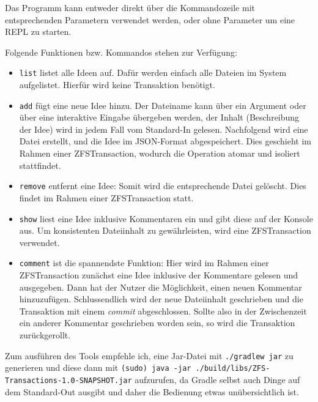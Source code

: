 \documentclass[12pt]{article}
\begin{document}
Das Programm kann entweder direkt über die Kommandozeile mit entsprechenden Parametern verwendet werden, oder ohne Parameter um eine REPL zu starten.

Folgende Funktionen bzw. Kommandos stehen zur Verfügung:
\begin{itemize}
	\item \texttt{list} listet alle Ideen auf. Dafür werden einfach alle Dateien im System aufgelistet. Hierfür wird keine Transaktion benötigt.
	\item \texttt{add} fügt eine neue Idee hinzu. 
	Der Dateiname kann über ein Argument oder über eine interaktive Eingabe übergeben werden, der Inhalt (Beschreibung der Idee) wird in jedem Fall vom Standard-In gelesen.
	Nachfolgend wird eine Datei erstellt, und die Idee im JSON-Format abgespeichert.
	Dies geschieht im Rahmen einer ZFSTransaction, wodurch die Operation atomar und isoliert stattfindet.
	\item \texttt{remove} entfernt eine Idee: Somit wird die entsprechende Datei gelöscht.
	Dies findet im Rahmen einer ZFSTransaction statt.
	\item \texttt{show} liest eine Idee inklusive Kommentaren ein und gibt diese auf der Konsole aus.
	Um konsistenten Dateiinhalt zu gewährleisten, wird eine ZFSTransaction verwendet.
	\item \texttt{comment} ist die spannendste Funktion:
	Hier wird im Rahmen einer ZFSTransaction zunächst eine Idee inklusive der Kommentare gelesen und ausgegeben. Dann hat der Nutzer die Möglichkeit, einen neuen Kommentar hinzuzufügen.
	Schlussendlich wird der neue Dateiinhalt geschrieben und die Transaktion mit einem \emph{commit} abgeschlossen.
	Sollte also in der Zwischenzeit ein anderer Kommentar geschrieben worden sein, so wird die Transaktion zurückgerollt.
	
\end{itemize}

Zum ausführen des Tools empfehle ich, eine Jar-Datei mit \texttt{./gradlew jar} zu generieren und diese dann mit \texttt{(sudo) java -jar ./build/libs/ZFS-Transactions-1.0-SNAPSHOT.jar} aufzurufen, da Gradle selbst auch Dinge auf dem Standard-Out ausgibt und daher die Bedienung etwas unübersichtlich ist.
\end{document}

